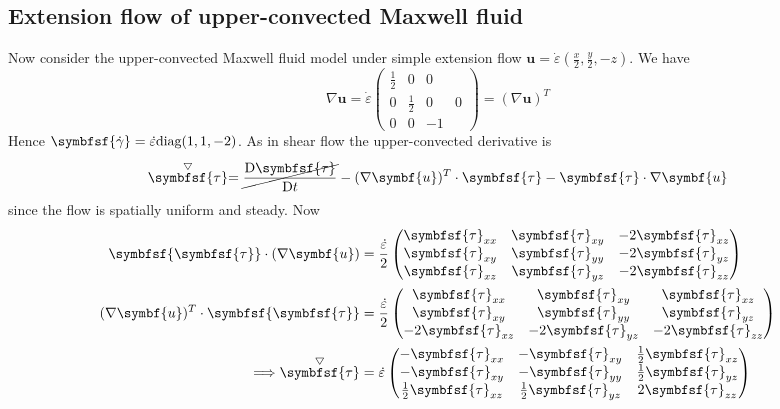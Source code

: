 \documentclass{jknotes}
\newcommand{\deps}{\dot{\varepsilon}}
\begin{document}
\subsection{Extension flow of upper-convected Maxwell fluid}
Now consider the upper-convected Maxwell fluid model under simple extension
flow $\symbf{u} = \deps(\frac{x}{2}, \frac{y}{2}, -z)$. We have
\begin{equation}
	\nabla \symbf{u} = \deps \begin{pmatrix} \frac{1}{2} & 0 & 0 \\ 0 &
	\frac{1}{2} & 0 & 0 \\ 0 & 0 & -1 \end{pmatrix} = (\nabla \symbf{u})^T
\end{equation}
Hence $\symbfsf{\srate} = \deps \text{diag}(1,1,-2)$. As in shear flow the
upper-convected derivative is
\begin{equation}
	\stackrel{\bigtriangledown}{\symbfsf{\tau}} = \cancel{\frac{\diffD
	\symbfsf{\tau}}{\diffD t}} - (\nabla \symbf{u})^T \cdot \symbfsf{\tau} -
	\symbfsf{\tau}\cdot\nabla \symbf{u} 
\end{equation}
since the flow is spatially uniform and steady. Now
\begin{align}
	\symbfsf{\symbfsf{\tau}}\cdot(\nabla \symbf{u}) &= \frac{\deps}{2}
	\begin{pmatrix} \symbfsf{\tau}_{xx} & \symbfsf{\tau}_{xy} &
		-2\symbfsf{\tau}_{xz} \\ \symbfsf{\tau}_{xy} & \symbfsf{\tau}_{yy} &
		-2 \symbfsf{\tau}_{yz}\\ \symbfsf{\tau}_{xz} & \symbfsf{\tau}_{yz} &
		-2 \symbfsf{\tau}_{zz}\end{pmatrix} \\
	(\nabla \symbf{u})^T\cdot\symbfsf{\symbfsf{\tau}} &=\frac{\deps}{2}
	\begin{pmatrix} \symbfsf{\tau}_{xx} & \symbfsf{\tau}_{xy} &
		\symbfsf{\tau}_{xz} \\ \symbfsf{\tau}_{xy} & \symbfsf{\tau}_{yy} &
		\symbfsf{\tau}_{yz}\\ -2\symbfsf{\tau}_{xz} & -2\symbfsf{\tau}_{yz} &
		-2 \symbfsf{\tau}_{zz}\end{pmatrix} \\
		\implies \stackrel{\bigtriangledown}{\symbfsf{\tau}}  &= \deps
		\begin{pmatrix} -\symbfsf{\tau}_{xx} & -\symbfsf{\tau}_{xy} &
			\frac{1}{2}\symbfsf{\tau}_{xz}\\
			-\symbfsf{\tau}_{xy} & -\symbfsf{\tau}_{yy} &
			\frac{1}{2}\symbfsf{\tau}_{yz} \\
			\frac{1}{2}\symbfsf{\tau}_{xz} & \frac{1}{2}\symbfsf{\tau}_{yz} &
			2\symbfsf{\tau}_{zz}
		\end{pmatrix}
\end{align}
\end{document}
